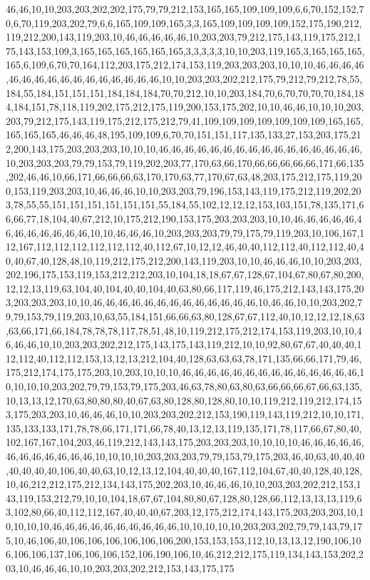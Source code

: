 46,46,10,10,203,203,202,202,175,79,79,212,153,165,165,109,109,109,6,6,70,152,152,70,6,70,119,203,202,79,6,6,165,109,109,165,3,3,165,109,109,109,109,152,175,190,212,119,212,200,143,119,203,10,46,46,46,46,46,10,203,203,79,212,175,143,119,175,212,175,143,153,109,3,165,165,165,165,165,165,3,3,3,3,3,10,10,203,119,165,3,165,165,165,165,6,109,6,70,70,164,112,203,175,212,174,153,119,203,203,203,10,10,10,46,46,46,46,46,46,46,46,46,46,46,46,46,46,46,46,10,10,203,203,202,212,175,79,212,79,212,78,55,184,55,184,151,151,151,184,184,184,70,70,212,10,10,203,184,70,6,70,70,70,70,184,184,184,151,78,118,119,202,175,212,175,119,200,153,175,202,10,10,46,46,10,10,10,203,203,79,212,175,143,119,175,212,175,212,79,41,109,109,109,109,109,109,109,165,165,165,165,165,46,46,46,48,195,109,109,6,70,70,151,151,117,135,133,27,153,203,175,212,200,143,175,203,203,203,10,10,10,46,46,46,46,46,46,46,46,46,46,46,46,46,46,46,46,10,203,203,203,79,79,153,79,119,202,203,77,170,63,66,170,66,66,66,66,66,171,66,135,202,46,46,10,66,171,66,66,66,63,170,170,63,77,170,67,63,48,203,175,212,175,119,200,153,119,203,203,10,46,46,46,10,10,203,203,79,196,153,143,119,175,212,119,202,203,78,55,55,151,151,151,151,151,151,55,184,55,102,12,12,12,153,103,151,78,135,171,66,66,77,18,104,40,67,212,10,175,212,190,153,175,203,203,203,10,10,46,46,46,46,46,46,46,46,46,46,46,46,10,10,46,46,46,10,203,203,203,79,79,175,79,119,203,10,106,167,112,167,112,112,112,112,112,112,40,112,67,10,12,12,46,40,40,112,112,40,112,112,40,40,40,67,40,128,48,10,119,212,175,212,200,143,119,203,10,10,46,46,46,10,10,203,203,202,196,175,153,119,153,212,212,203,10,104,18,18,67,67,128,67,104,67,80,67,80,200,12,12,13,119,63,104,40,104,40,40,104,40,63,80,66,117,119,46,175,212,143,143,175,203,203,203,203,10,10,46,46,46,46,46,46,46,46,46,46,46,46,46,10,46,46,10,10,203,202,79,79,153,79,119,203,10,63,55,184,151,66,66,63,80,128,67,67,112,40,10,12,12,12,18,63,63,66,171,66,184,78,78,78,117,78,51,48,10,119,212,175,212,174,153,119,203,10,10,46,46,46,10,10,203,203,202,212,175,143,175,143,119,212,10,10,92,80,67,67,40,40,40,112,112,40,112,112,153,13,12,13,212,104,40,128,63,63,63,78,171,135,66,66,171,79,46,175,212,174,175,175,203,10,203,10,10,10,46,46,46,46,46,46,46,46,46,46,46,46,46,46,10,10,10,10,203,202,79,79,153,79,175,203,46,63,78,80,63,80,63,66,66,66,67,66,63,135,10,13,13,12,170,63,80,80,80,40,67,63,80,128,80,128,80,10,10,119,212,119,212,174,153,175,203,203,10,46,46,46,10,10,203,203,202,212,153,190,119,143,119,212,10,10,171,135,133,133,171,78,78,66,171,171,66,78,40,13,12,13,119,135,171,78,117,66,67,80,40,102,167,167,104,203,46,119,212,143,143,175,203,203,203,10,10,10,10,46,46,46,46,46,46,46,46,46,46,46,46,10,10,10,10,203,203,203,79,79,153,79,175,203,46,40,63,40,40,40,40,40,40,40,106,40,40,63,10,12,13,12,104,40,40,40,167,112,104,67,40,40,128,40,128,10,46,212,212,175,212,134,143,175,202,203,10,46,46,46,10,10,203,203,202,212,153,143,119,153,212,79,10,10,104,18,67,67,104,80,80,67,128,80,128,66,112,13,13,13,119,63,102,80,66,40,112,112,167,40,40,40,67,203,12,175,212,174,143,175,203,203,203,10,10,10,10,10,46,46,46,46,46,46,46,46,46,46,10,10,10,10,10,203,203,202,79,79,143,79,175,10,46,106,40,106,106,106,106,106,106,200,153,153,153,112,10,13,13,12,190,106,106,106,106,137,106,106,106,152,106,190,106,10,46,212,212,175,119,134,143,153,202,203,10,46,46,46,10,10,203,203,202,212,153,143,175,175